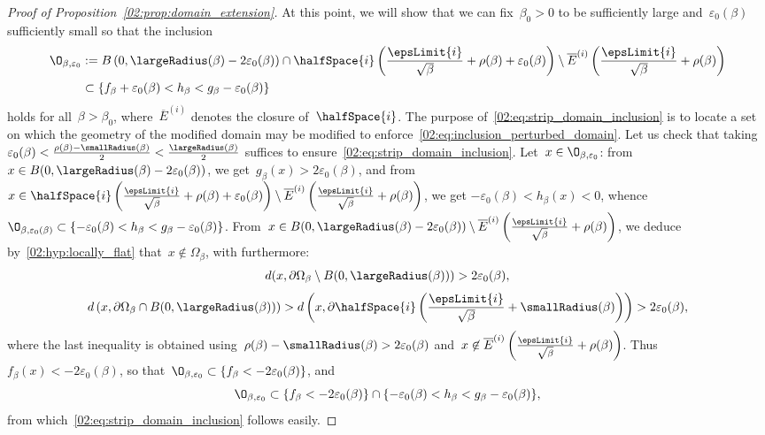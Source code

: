 \begin{proof}[Proof of Proposition~\ref{02:prop:domain_extension}]
        At this point, we will show that we can fix~$\beta_0>0$ to be sufficiently large and~$\varepsilon_0(\beta)$ sufficiently small so that the inclusion
        \begin{equation}\label{02:eq:strip_domain_inclusion}
            \begin{aligned}\O_{\beta,\varepsilon_0} &:= B\left(0,\largeRadius(\beta)-2\varepsilon_0(\beta)\right) \cap \halfSpace{i}\left(\frac{\epsLimit{i}}{\sqrt\beta}+\rho(\beta)+\varepsilon_0(\beta)\right)\setminus \overline{E}^{(i)} \left(\frac{\epsLimit{i}}{\sqrt\beta}+\rho(\beta)\right)\\
                &\subset \left\{f_\beta+\varepsilon_0(\beta) < h_\beta < g_\beta-\varepsilon_0(\beta)\right\}
            \end{aligned}
        \end{equation}
        holds for all~$\beta>\beta_0$, where~$\overline{E}^{(i)}$ denotes the closure of~$\halfSpace{i}$. The purpose of~\eqref{02:eq:strip_domain_inclusion} is to locate a set on which the geometry of the modified domain may be modified to enforce~\eqref{02:eq:inclusion_perturbed_domain}.
        Let us check that taking~$\varepsilon_0(\beta) < \frac{\rho(\beta)-\smallRadius(\beta)}2<\frac{\largeRadius(\beta)}{2}$ suffices to ensure~\eqref{02:eq:strip_domain_inclusion}.
        Let~$x\in\O_{\beta,\varepsilon_0}$: from~$x\in B(0,\largeRadius(\beta)-2\varepsilon_0(\beta))$, we get~$g_\beta(x)>2\varepsilon_0(\beta)$, and from~$x\in \halfSpace{i}\left(\frac{\epsLimit{i}}{\sqrt\beta}+\rho(\beta)+\varepsilon_0(\beta)\right)\setminus \overline{E}^{(i)} \left(\frac{\epsLimit{i}}{\sqrt\beta}+\rho(\beta)\right)$, we get $-\varepsilon_0(\beta)<h_\beta(x)<0$, whence~$\O_{\beta,\varepsilon_0(\beta)}\subset \{ -\varepsilon_0(\beta) < h_\beta < g_\beta-\varepsilon_0(\beta)\}$.
        From~$x\in B(0,\largeRadius(\beta)-2\varepsilon_0(\beta))\setminus\overline{E}^{(i)}\left(\frac{\epsLimit{i}}{\sqrt\beta}+\rho(\beta)\right)$, we deduce by~\eqref{02:hyp:locally_flat} that~$x\not\in \Omega_\beta$, with furthermore:
        $$d(x,\partial\Omega_\beta \setminus B(0,\largeRadius(\beta)))>2\varepsilon_0(\beta),$$
        $$d\left(x,\partial\Omega_\beta\cap B(0,\largeRadius(\beta))\right)>d\left(x,\partial\halfSpace{i}\left(\frac{\epsLimit{i}}{\sqrt\beta} + \smallRadius(\beta)\right)\right)>2\varepsilon_0(\beta),$$
        where the last inequality is obtained using~$\rho(\beta)-\smallRadius(\beta)>2\varepsilon_0(\beta)$ and~$x\not\in\overline{E}^{(i)}\left(\frac{\epsLimit{i}}{\sqrt\beta}+\rho(\beta)\right)$.
        Thus~$f_\beta(x)<-2\varepsilon_0(\beta)$, so that~$\O_{\beta,\varepsilon_0}\subset\{f_\beta<-2\varepsilon_0(\beta)\}$, and~$$\O_{\beta,\varepsilon_0} \subset \{f_\beta<-2\varepsilon_0(\beta)\}\cap\{-\varepsilon_0(\beta)<h_\beta<g_\beta-\varepsilon_0(\beta)\},$$ from which~\eqref{02:eq:strip_domain_inclusion} follows easily.


\end{proof}
